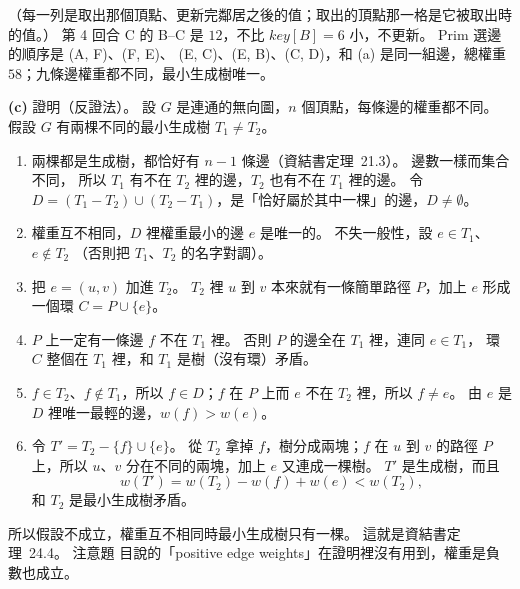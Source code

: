\begin{pastsoln}
（每一列是取出那個頂點、更新完鄰居之後的值；取出的頂點那一格是它被取出時的值。） 第 4 回合
C 的 B--C 是 $12$，不比 $\mathit{key}[B] = 6$ 小，不更新。 Prim 選邊的順序是 (A, F)、(F, E)、
(E, C)、(E, B)、(C, D)，和 (a) 是同一組邊，總權重 $58$；九條邊權重都不同，最小生成樹唯一。

\textbf{(c)} 證明（反證法）。 設 $G$ 是連通的無向圖，$n$ 個頂點，每條邊的權重都不同。 假設 $G$
有兩棵不同的最小生成樹 $T_1 \ne T_2$。

\begin{enumerate}
\item 兩棵都是生成樹，都恰好有 $n - 1$ 條邊（資結書定理~21.3）。 邊數一樣而集合不同，
所以 $T_1$ 有不在 $T_2$ 裡的邊，$T_2$ 也有不在 $T_1$ 裡的邊。 令
$D = (T_1 - T_2) \cup (T_2 - T_1)$，是「恰好屬於其中一棵」的邊，$D \ne \emptyset$。
\item 權重互不相同，$D$ 裡權重最小的邊 $e$ 是唯一的。 不失一般性，設 $e \in T_1$、$e \notin T_2$
（否則把 $T_1$、$T_2$ 的名字對調）。
\item 把 $e = (u, v)$ 加進 $T_2$。 $T_2$ 裡 $u$ 到 $v$ 本來就有一條簡單路徑 $P$，加上 $e$ 形成
一個環 $C = P \cup \{e\}$。
\item $P$ 上一定有一條邊 $f$ 不在 $T_1$ 裡。 否則 $P$ 的邊全在 $T_1$ 裡，連同 $e \in T_1$，
環 $C$ 整個在 $T_1$ 裡，和 $T_1$ 是樹（沒有環）矛盾。
\item $f \in T_2$、$f \notin T_1$，所以 $f \in D$；$f$ 在 $P$ 上而 $e$ 不在 $T_2$ 裡，所以
$f \ne e$。 由 $e$ 是 $D$ 裡唯一最輕的邊，$w(f) > w(e)$。
\item 令 $T' = T_2 - \{f\} \cup \{e\}$。 從 $T_2$ 拿掉 $f$，樹分成兩塊；$f$ 在 $u$ 到 $v$ 的路徑
$P$ 上，所以 $u$、$v$ 分在不同的兩塊，加上 $e$ 又連成一棵樹。 $T'$ 是生成樹，而且
\[
w(T') = w(T_2) - w(f) + w(e) < w(T_2),
\]
和 $T_2$ 是最小生成樹矛盾。
\end{enumerate}
所以假設不成立，權重互不相同時最小生成樹只有一棵。 這就是資結書定理~24.4。 注意題
目說的「positive edge weights」在證明裡沒有用到，權重是負數也成立。

\end{pastsoln}
